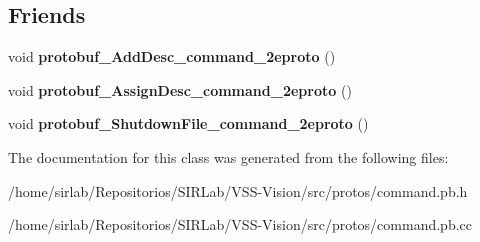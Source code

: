 \subsection*{Friends}
\begin{DoxyCompactItemize}
\item 
\hypertarget{classvss__command_1_1Global__Commands_a4825d92f856fcb4b02c67b601c433796}{void {\bfseries protobuf\-\_\-\-Add\-Desc\-\_\-command\-\_\-2eproto} ()}\label{classvss__command_1_1Global__Commands_a4825d92f856fcb4b02c67b601c433796}

\item 
\hypertarget{classvss__command_1_1Global__Commands_a4c6fb97c25079d49daf010087d869100}{void {\bfseries protobuf\-\_\-\-Assign\-Desc\-\_\-command\-\_\-2eproto} ()}\label{classvss__command_1_1Global__Commands_a4c6fb97c25079d49daf010087d869100}

\item 
\hypertarget{classvss__command_1_1Global__Commands_a4cf10633ad46690f5eec6bdbbcf62de0}{void {\bfseries protobuf\-\_\-\-Shutdown\-File\-\_\-command\-\_\-2eproto} ()}\label{classvss__command_1_1Global__Commands_a4cf10633ad46690f5eec6bdbbcf62de0}

\end{DoxyCompactItemize}


The documentation for this class was generated from the following files\-:\begin{DoxyCompactItemize}
\item 
/home/sirlab/\-Repositorios/\-S\-I\-R\-Lab/\-V\-S\-S-\/\-Vision/src/protos/command.\-pb.\-h\item 
/home/sirlab/\-Repositorios/\-S\-I\-R\-Lab/\-V\-S\-S-\/\-Vision/src/protos/command.\-pb.\-cc\end{DoxyCompactItemize}
